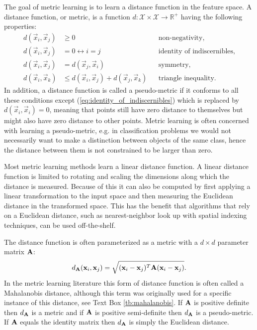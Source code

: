 The goal of metric learning is to learn a distance function in the feature space. A distance function, or metric, is a function $d: \mathcal{X} \times \mathcal{X} \rightarrow \mathbb{R}^{+}$ having the following properties:
\begin{subequations}
\begin{align}
        d(\vec{x}_i, \vec{x}_j) & \geq 0 &  &\text{non-negativity}, \label{eq:non-negativity}\\
        d(\vec{x}_i, \vec{x}_j) & = 0 \leftrightarrow i = j & &\text{identity of indiscernibles}, \label{eq:identity_of_indiscernibles} \\
        d(\vec{x}_i, \vec{x}_j) & = d(\vec{x}_j, \vec{x}_i) &  &\text{symmetry}, \label{eq:symmetry}\\
        d(\vec{x}_i, \vec{x}_k) & \leq d(\vec{x}_i, \vec{x}_j) + d(\vec{x}_j, \vec{x}_k) &  &\text{triangle inequality}. \label{eq:triangle_unequality}
\end{align}
\end{subequations}
In addition, a distance function is called a pseudo-metric if it conforms to all these conditions except (\ref{eq:identity_of_indiscernibles}) which is replaced by $d(\vec{x}_i, \vec{x}_i) = 0$, meaning that points still have zero distance to themselves but might also have zero distance to other points. Metric learning is often concerned with learning a pseudo-metric, e.g. in classification problems we would not necessarily want to make a distinction between objects of the same class, hence the distance between them is not constrained to be larger than zero.

Most metric learning methods learn a linear distance function. A linear distance function is limited to rotating and scaling the dimensions along which the distance is measured. Because of this it can also be computed by first applying a linear transformation to the input space and then measuring the Euclidean distance in the transformed space. This has the benefit that algorithms that rely on a Euclidean distance, such as nearest-neighbor look up with spatial indexing techniques, can be used off-the-shelf.

The distance function is often parameterized as a metric with a $d \times d$ parameter matrix $\mathbf{A}$:
\begin{equation}
d_{\mathbf{A}}(\mathbf{x}_i, \mathbf{x}_j) = \sqrt{(\mathbf{x}_i - \mathbf{x}_j)^T\mathbf{A}(\mathbf{x}_i - \mathbf{x}_j)}.
\label{eq:linearmetric}
\end{equation}
In the metric learning literature this form of distance function is often called a Mahalanobis distance, although this term was originally used for a specific instance of this distance, see Text Box \ref{tb:mahalanobis}. If $\mathbf{A}$ is positive definite then $d_{\mathbf{A}}$ is a metric and if $\mathbf{A}$ is positive semi-definite then $d_{\mathbf{A}}$ is a pseudo-metric. If $\mathbf{A}$ equals the identity matrix then $d_{\mathbf{A}}$ is simply the Euclidean distance.

